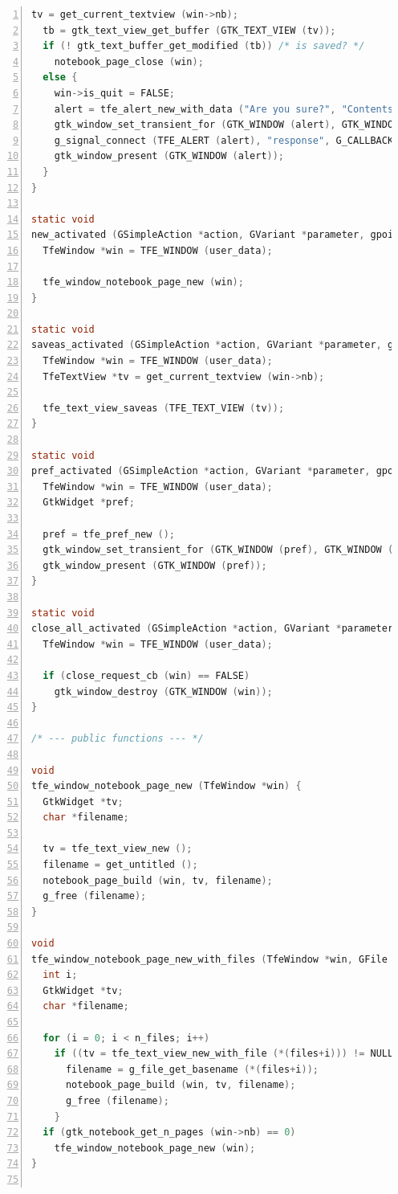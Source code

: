 \begin{lstlisting}[language=C, numbers=left]
  tv = get_current_textview (win->nb);
  tb = gtk_text_view_get_buffer (GTK_TEXT_VIEW (tv));
  if (! gtk_text_buffer_get_modified (tb)) /* is saved? */
    notebook_page_close (win);
  else {
    win->is_quit = FALSE;
    alert = tfe_alert_new_with_data ("Are you sure?", "Contents aren't saved yet.\nAre you sure to close?", "Close");
    gtk_window_set_transient_for (GTK_WINDOW (alert), GTK_WINDOW (win));
    g_signal_connect (TFE_ALERT (alert), "response", G_CALLBACK (alert_response_cb), win);
    gtk_window_present (GTK_WINDOW (alert));
  }
}

static void
new_activated (GSimpleAction *action, GVariant *parameter, gpointer user_data) {
  TfeWindow *win = TFE_WINDOW (user_data);

  tfe_window_notebook_page_new (win);
}

static void
saveas_activated (GSimpleAction *action, GVariant *parameter, gpointer user_data) {
  TfeWindow *win = TFE_WINDOW (user_data);
  TfeTextView *tv = get_current_textview (win->nb);

  tfe_text_view_saveas (TFE_TEXT_VIEW (tv));
}

static void
pref_activated (GSimpleAction *action, GVariant *parameter, gpointer user_data) {
  TfeWindow *win = TFE_WINDOW (user_data);
  GtkWidget *pref;

  pref = tfe_pref_new ();
  gtk_window_set_transient_for (GTK_WINDOW (pref), GTK_WINDOW (win));
  gtk_window_present (GTK_WINDOW (pref));
}

static void
close_all_activated (GSimpleAction *action, GVariant *parameter, gpointer user_data) {
  TfeWindow *win = TFE_WINDOW (user_data);

  if (close_request_cb (win) == FALSE)
    gtk_window_destroy (GTK_WINDOW (win));
}

/* --- public functions --- */

void
tfe_window_notebook_page_new (TfeWindow *win) {
  GtkWidget *tv;
  char *filename;

  tv = tfe_text_view_new ();
  filename = get_untitled ();
  notebook_page_build (win, tv, filename);
  g_free (filename);
}

void
tfe_window_notebook_page_new_with_files (TfeWindow *win, GFile **files, int n_files) {
  int i;
  GtkWidget *tv;
  char *filename;

  for (i = 0; i < n_files; i++)
    if ((tv = tfe_text_view_new_with_file (*(files+i))) != NULL) {
      filename = g_file_get_basename (*(files+i));
      notebook_page_build (win, tv, filename);
      g_free (filename);
    }
  if (gtk_notebook_get_n_pages (win->nb) == 0)
    tfe_window_notebook_page_new (win);
}


\end{lstlisting}
